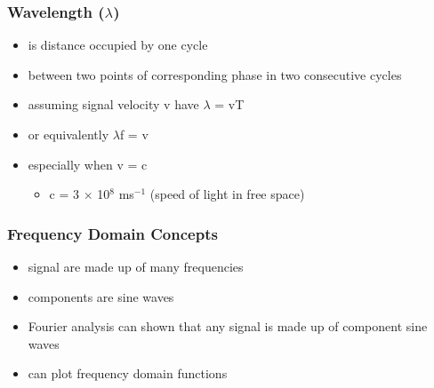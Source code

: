 \documentclass[pdflatex,compress]{beamer}
\begin{document}
\begin{frame}
	\frametitle{Wavelength ($\lambda$)}
	\begin{itemize}
		\item is distance occupied by one cycle
		\item between two points of corresponding phase in two consecutive cycles
		\item assuming signal velocity v have $\lambda$ = vT
		\item or equivalently $\lambda$f = v
		\item especially when v = c
		\begin{itemize}
			\item c = 3 $\times$ 10$^\text{8}$ ms$^{-1}$ (speed of light in free space)
		\end{itemize}
	\end{itemize}
\end{frame}

\begin{frame}
	\frametitle{Frequency Domain Concepts}
	\begin{itemize}
		\item signal are made up of many frequencies
		\item components are sine waves
		\item Fourier analysis can shown that any signal is made up of component sine waves
		\item can plot frequency domain functions
	\end{itemize}
\end{frame}
\end{document}
